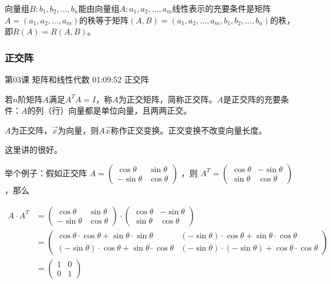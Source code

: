 \documentclass[UTF8]{ctexart}
\begin{document}
向量组$B:b_{1},b_{2},\dots,b_{n}$能由向量组$A:a_{1},a_{2},\dots,a_{m}$线性表示的充要条件是矩阵$A=(a_{1},a_{2},\dots,a_{m})$的秩等于矩阵$(A,B)=(a_{1},a_{2},\dots,a_{m},b_{1},b_{2},\dots,b_{n})$的秩，即$R(A)=R(A,B)$。

\subsubsection{正交阵}

第03课 矩阵和线性代数 01:09:52 正交阵

若$n$阶矩阵$A$满足$A^{T}A=I$，称$A$为正交矩阵，简称正交阵。$A$是正交阵的充要条件：$A$的列（行）向量都是单位向量，且两两正交。

$A$为正交阵，$\vec{x}$为向量，则$A\vec{x}$称作正交变换。正交变换不改变向量长度。

这里讲的很好。

举个例子：假如正交阵
$A=\begin{pmatrix} \cos \theta & \sin \theta \\ -\sin \theta & \cos \theta \end{pmatrix}$
，则
$A^{T}=\begin{pmatrix} \cos \theta & -\sin \theta \\ \sin \theta & \cos \theta \end{pmatrix}$
，那么

\begin{equation}
\begin{aligned}
A \cdot A^{T}&=\begin{pmatrix} \cos \theta & \sin \theta \\ -\sin \theta & \cos \theta \end{pmatrix} \cdot \begin{pmatrix} \cos \theta & -\sin \theta \\ \sin \theta & \cos \theta \end{pmatrix} \\
&=
\begin{pmatrix}
\cos \theta \cdot \cos \theta + \sin \theta \cdot \sin \theta & (-\sin \theta) \cdot \cos \theta + \sin \theta \cdot \cos \theta \\
(-\sin \theta) \cdot \cos \theta + \sin \theta \cdot \cos \theta & (-\sin \theta) \cdot (-\sin \theta) + \cos \theta \cdot \cos \theta
\end{pmatrix} \\
&=\begin{pmatrix} 1 & 0 \\ 0 & 1 \end{pmatrix}
\end{aligned}
\end{equation}
\end{document}
